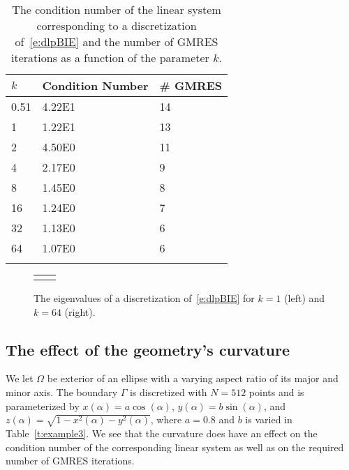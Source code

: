 \begin{table}[htps]
\caption{\label{t:example2} The condition number of the linear system
corresponding to a discretization of~\eqref{e:dlpBIE} and the number of
GMRES iterations as a function of the parameter $k$.}
\centering
\begin{tabular*}{0.8\textwidth}{@{\extracolsep{\fill}}lll}
$k$ & Condition Number & \# GMRES \\
\hline\noalign{\smallskip}
0.51 & 4.22E1 & 14 \\
1    & 1.22E1 & 13 \\
2    & 4.50E0 & 11 \\
4    & 2.17E0 & 9  \\
8    & 1.45E0 & 8  \\  
16   & 1.24E0 & 7  \\ 
32   & 1.13E0 & 6  \\
64   & 1.07E0 & 6  \\
\noalign{\smallskip}\hline
\end{tabular*}
\end{table}

\begin{figure}[htps]
\centering
\begin{tabular}{cc}
 &

\end{tabular}
\caption{\label{f:evalues} The eigenvalues of a discretization
of~\eqref{e:dlpBIE} for $k=1$ (left) and $k=64$ (right).}
\end{figure}


\subsection{The effect of the geometry's curvature}
We let $\Omega$ be exterior of an ellipse with a varying aspect ratio
of its major and minor axis.  The boundary $\Gamma$ is discretized with
$N=512$ points and is parameterized by $x(\alpha) = a\cos(\alpha)$,
$y(\alpha) = b\sin(\alpha)$, and $z(\alpha) =
\sqrt{1-x^{2}(\alpha)-y^{2}(\alpha)}$, where $a = 0.8$ and $b$ is
varied in Table~\ref{t:example3}.  We see that the curvature does have
an effect on the condition number of the corresponding linear system as
well as on the required number of GMRES iterations.


